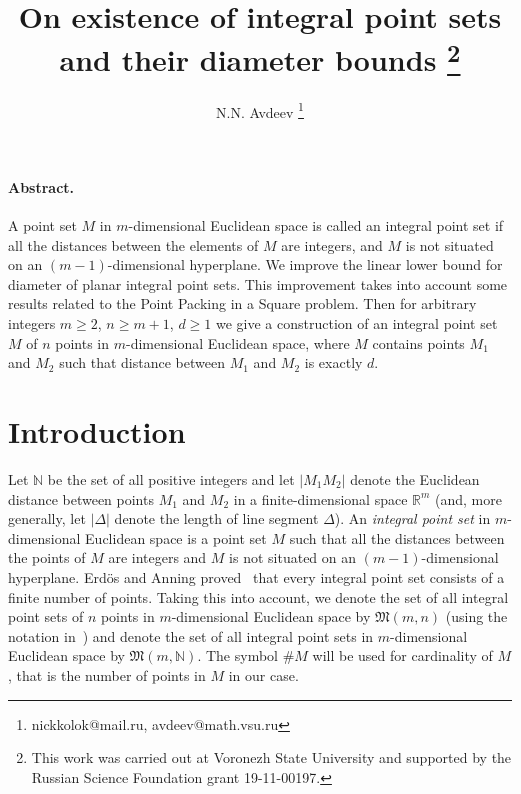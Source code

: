 \documentclass[a4paper,14pt]{article} %
\theoremstyle{plain}
\theoremstyle{definition}
\begin{document}

\title{
	On existence of integral point sets and their diameter bounds
	\footnote{
		This work was carried out at Voronezh State University and supported by the Russian Science
		Foundation grant 19-11-00197.
	}
}

\author{
	N.N. Avdeev
	\footnote{nickkolok@mail.ru, avdeev@math.vsu.ru}
}

\maketitle

\paragraph{Abstract.}
A point set $M$ in $m$-dimensional Euclidean space is called an integral point set if all the distances between the
elements of $M$ are integers, and $M$ is not situated on an $(m-1)$-dimensional hyperplane.
We improve the linear lower bound for diameter of planar integral point sets.
This improvement takes into account some results related to the Point Packing in a Square problem.
Then for arbitrary integers $m \geq 2$, $n \geq m+1$, $d \geq 1$
we give a construction of an integral point set $M$ of $n$ points in $m$-dimensional Euclidean space,
where $M$ contains points $M_1$ and $M_2$ such that distance between $M_1$ and $M_2$ is exactly $d$.



\section{Introduction}
Let $\mathbb{N}$ be the set of all positive integers and let $|M_1 M_2|$ denote the Euclidean distance
between points $M_1$ and $M_2$ in a finite-dimensional space $\mathbb{R}^m$
(and, more generally, let $|\Delta|$ denote the length of line segment $\Delta$).
An \textit{integral point set} in $m$-dimensional Euclidean space is a point set $M$ such that all the distances between the
points of $M$ are integers and $M$ is not situated on an $(m-1)$-dimensional hyperplane.
Erd\"os and Anning proved~\cite{anning1945integral,erdos1945integral} that every integral point set consists of a finite number of points.
Taking this into account, we denote the set of all integral point sets of $n$ points in $m$-dimensional Euclidean space by
$\mathfrak{M}(m,n)$ (using the notation in~\cite{our-vmmsh-2018})
and denote the set of all integral point sets in $m$-dimensional Euclidean space by $\mathfrak{M}(m,\mathbb{N})$.
The symbol $\# M$ will be used for cardinality of $M$, that is the number of points in $M$ in our case.
\end{document}

